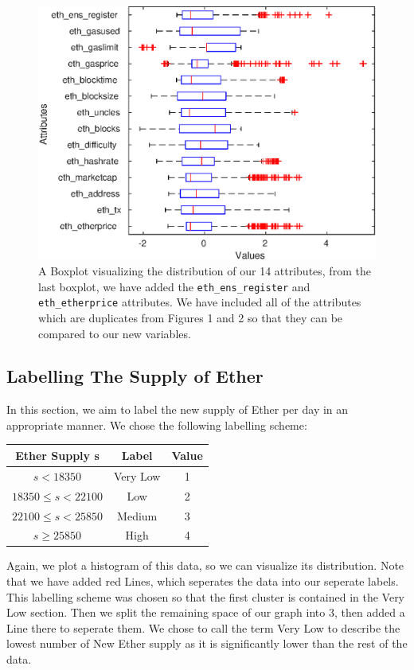 \documentclass{article}
\begin{document}
\begin{figure}[H]
\centering
\caption{A Boxplot visualizing the distribution of our 14 attributes, from the last boxplot, we have added the \texttt{eth\_ens\_register} and \texttt{eth\_etherprice} attributes. We have included all of the attributes which are duplicates from Figures 1 and 2 so that they can be compared to our new variables.}
\includegraphics{local/boxplot_after_norm_supply.eps}
\end{figure}

\subsection{Labelling The Supply of Ether}
In this section, we aim to label the new supply of Ether per day in an appropriate manner. We chose the following labelling scheme:

\begin{center}
\begin{tabular}{ |c|c|c| } 
\hline
Ether Supply s & Label & Value\\
\hline
$s < 18350$ & Very Low & 1\\ 
$18350 \leq s < 22100$ & Low & 2\\ 
$22100 \leq s < 25850$ & Medium & 3\\ 
$ s \geq 25850$ & High & 4\\ 
\hline
\end{tabular}
\end{center}

Again, we plot a histogram of this data, so we can visualize its distribution. Note that we have added red Lines, which seperates the data into our seperate labels. This labelling scheme was chosen so that the first cluster is contained in the Very Low section. Then we split the remaining space of our graph into 3, then added a Line there to seperate them. We chose to call the term Very Low to describe the lowest number of New Ether supply as it is significantly lower than the rest of the data.
\end{document}
